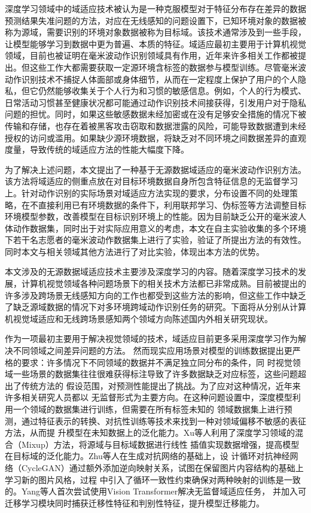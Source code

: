 深度学习领域中的域适应技术被认为是一种克服模型对于特征分布存在差异的数据预测结果失准问题的方法，对应在无线感知的问题设置下，已知环境对象的数据被称为源域，需要识别的环境对象数据被称为目标域。该技术通常涉及到一些手段，让模型能够学习到数据中更为普遍、本质的特征。域适应最初主要用于计算机视觉领域，目前也被证明在毫米波动作识别领域具有作用，近年来许多相关工作都被提出。但这些工作大都需要获取一定源环境含标签的数据参与模型训练。尽管毫米波动作识别技术不捕捉人体面部或身体细节，从而在一定程度上保护了用户的个人隐私，但它仍然能够收集关于个人行为和习惯的敏感信息。例如，个人的行为模式、日常活动习惯甚至健康状况都可能通过动作识别技术间接获得，引发用户对于隐私问题的担忧。同时，如果这些敏感数据未经加密或在没有足够安全措施的情况下被传输和存储，也存在着被黑客攻击窃取和数据泄露的风险，可能导致数据遭到未经授权的访问或滥用。如果缺少源环境数据，将缺乏对不同环境之间数据差异的直观度量，导致传统的域适应方法的性能大幅度下降。

为了解决上述问题，本文提出了一种基于无源数据域适应的毫米波动作识别方法。该方法将域适应的侧重点放在对目标环境数据自身所包含特征信息的无监督学习上。针对动作识别的实际场景对域适应方法实现的要求，分布设置不同的处理策略，在不直接利用已有环境数据的条件下，利用联邦学习、伪标签等方法调整目标环境模型参数，改善模型在目标识别环境上的性能。因为目前缺乏公开的毫米波人体动作数据集，同时出于对实际应用意义的考虑，本文在自主实验收集的多个环境下若干名志愿者的毫米波动作数据集上进行了实验，验证了所提出方法的有效性。同时本文与相关领域其他方法进行了对比实验，体现出本方法的优势。


本文涉及的无源数据域适应技术主要涉及深度学习的内容。随着深度学习技术的发展，计算机视觉领域各种问题场景下的相关技术方法都已非常成熟。目前被提出的许多涉及跨场景无线感知方向的工作也都受到这些方法的影响，但这些工作中缺乏了缺乏源域数据的情况下对多环境跨域动作识别任务的研究。下面将从分别从计算机视觉域适应和无线跨场景感知两个领域方向陈述国内外相关研究现状。


作为一项最初主要用于解决视觉领域的技术，域适应目前更多采用深度学习作为解决不同领域之间差异问题的方法。
然而现实应用场景对模型的训练数据提出更严格的要求：许多情况下不同领域的数据并不满足独立同分布的条件，同
时视觉领域一些场景的数据集往往很难获得标注导致了许多数据缺乏对应标签，这些问题超出了传统方法的
假设范围\cite{liu2022deep}，对预测性能提出了挑战。为了应对这种情况，近年来许多相关研究人员都以
无监督形式为主要方向。在这种问题设置中，深度模型利用一个领域的数据集进行训练，但需要在所有标签未知的
领域数据集上进行预测，通过特征表示的转换、对抗性训练等技术来找到一种对领域偏移不敏感的表征方法，从而提
升模型在未知数据上的泛化能力。Xu等人\cite{xu2020adversarial}利用了深度学习领域的混合（Mixup）方法，将源域与目标域数据进行线性
插值实现数据增强，提高模型在目标域的泛化能力。Zhu等人\cite{zhu2017unpaired}在生成对抗网络的基础上，设
计循环对抗神经网络（CycleGAN）通过额外添加逆向映射关系，试图在保留图片内容结构的基础上学习新的图片风格，过程
中引入了循环一致性约束确保对两种映射的训练是一致的。Yang等人\cite{yang2023tvt}首次尝试使用Vision Transformer解决无监督域适应任务，
并加入可迁移学习模块同时捕获迁移性特征和判别性特征，提升模型迁移能力。


